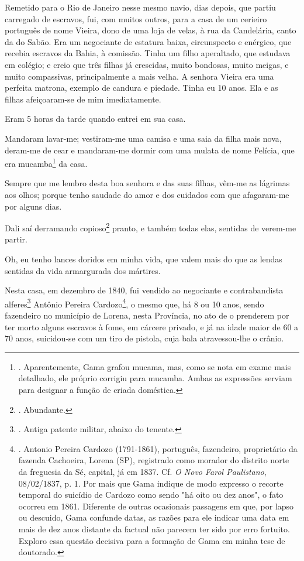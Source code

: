Remetido para o Rio de Janeiro nesse mesmo navio, dias depois, que
partiu carregado de escravos, fui, com muitos outros, para a casa de um
cerieiro português de nome Vieira, dono de uma loja de velas, à rua da
Candelária, canto da do Sabão. Era um negociante de estatura baixa,
circunspecto e enérgico, que recebia escravos da Bahia, à comissão.
Tinha um filho aperaltado, que estudava em colégio; e creio que três
filhas já crescidas, muito bondosas, muito meigas, e muito compassivas,
principalmente a mais velha. A senhora Vieira era uma perfeita matrona,
exemplo de candura e piedade. Tinha eu 10 anos. Ela e as filhas
afeiçoaram-se de mim imediatamente.

Eram 5 horas da tarde quando entrei em sua casa.

Mandaram lavar-me; vestiram-me uma camisa e uma saia da filha mais nova,
deram-me de cear e mandaram-me dormir com uma mulata de nome Felícia,
que era mucamba\footnote{. Aparentemente, Gama grafou mucama, mas, como
  se nota em exame mais detalhado, ele próprio corrigiu para mucamba.
  Ambas as expressões serviam para designar a função de criada
  doméstica.} da casa.

Sempre que me lembro desta boa senhora e das suas filhas, vêm-me as
lágrimas aos olhos; porque tenho saudade do amor e dos cuidados com que
afagaram-me por alguns dias.

Dali saí derramando copioso\footnote{. Abundante.} pranto, e também
todas elas, sentidas de verem-me partir.

Oh, eu tenho lances doridos em minha vida, que valem mais do que as
lendas sentidas da vida armargurada dos mártires.

Nesta casa, em dezembro de 1840, fui vendido ao negociante e
contrabandista alferes\footnote{. Antiga patente militar, abaixo do
  tenente.} Antônio Pereira Cardozo\footnote{. Antonio Pereira Cardozo
  (1791-1861), português, fazendeiro, proprietário da fazenda Cachoeira,
  Lorena (SP), registrado como morador do distrito norte da freguesia da
  Sé, capital, já em 1837. Cf. \emph{O Novo Farol Paulistano},
  08/02/1837, p. 1. Por mais que Gama indique de modo expresso o recorte
  temporal do suicídio de Cardozo como sendo "há oito ou dez anos", o
  fato ocorreu em 1861. Diferente de outras ocasionais passagens em que,
  por lapso ou descuido, Gama confunde datas, as razões para ele indicar
  uma data em mais de dez anos distante da factual não parecem ter sido
  por erro fortuito. Exploro essa questão decisiva para a formação de
  Gama em minha tese de doutorado.}, o mesmo que, há 8 ou 10 anos, sendo
fazendeiro no município de Lorena, nesta Província, no ato de o
prenderem por ter morto alguns escravos à fome, em cárcere privado, e já
na idade maior de 60 a 70 anos, suicidou-se com um tiro de pistola, cuja
bala atravessou-lhe o crânio.

